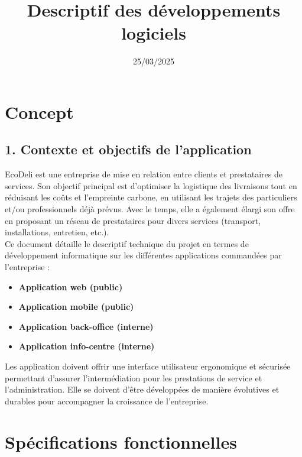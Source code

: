 \documentclass{report}
\title{Descriptif des développements logiciels}
\date{25/03/2025}
\begin{document}
\maketitle

\section*{\centering Concept}
\vspace{0.2cm}

\subsection*{1. Contexte et objectifs de l'application}
\vspace{0.2cm}
EcoDeli est une entreprise de mise en relation entre clients et prestataires de services. Son objectif principal est d’optimiser la logistique des livraisons tout en réduisant les coûts et l’empreinte carbone, en utilisant les trajets des particuliers et/ou professionnels déjà prévus. Avec le temps, elle a également élargi son offre en proposant un réseau de prestataires pour divers services (transport, installations, entretien, etc.). \\

\noindent Ce document détaille le descriptif technique du projet en termes de développement informatique sur les différentes applications commandées par l’entreprise :
\begin{itemize}
    \item \textbf{Application web (public)}
    \item \textbf{Application mobile (public)}
    \item \textbf{Application back-office (interne)}
    \item \textbf{Application info-centre (interne)}
\end{itemize}

\vspace{0.5cm}
\noindent Les application doivent offrir une interface utilisateur ergonomique et sécurisée permettant d’assurer l’intermédiation pour les prestations de service et l'administration. Elle se doivent d'être développées de manière évolutives et durables pour accompagner la croissance de l’entreprise. \\

\section*{\centering Spécifications fonctionnelles}
\vspace{0.2cm}
\end{document}
